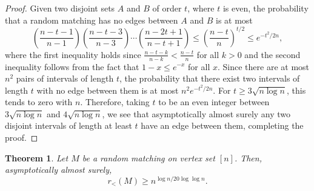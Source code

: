 \documentclass[11pt]{article}
\newtheorem{theorem}{Theorem}[section]
\newcommand{\rord}{r_{<}}
\begin{document}
\begin{proof}
Given two disjoint sets $A$ and $B$ of order $t$, where $t$ is even, the probability that a random matching has no edges between $A$ and $B$ is at most
\[
	\left(\frac{n-t-1}{n-1}\right) \left( \frac{n-t-3}{n-3} \right) \cdots \left( \frac{n-2t+1}{n-t+1} \right) \leq \left(\frac{n-t}{n}\right)^{t/2} \leq e^{-t^2/2n},
\]
where the first inequality holds since $\frac{n-t-k}{n-k} < \frac{n-t}{n}$ for all $k > 0$ and the second inequality follows from the fact that $1 - x \le e^{-x}$ for all $x$. Since there are at most $n^2$ pairs of intervals of length $t$, the probability that there exist two intervals of length $t$ with no edge between them is at most $n^2 e^{-t^2/2n}$. For $t \geq 3 \sqrt{n\log n}$, this tends to zero with $n$. Therefore, taking $t$ to be an even integer between $3 \sqrt{n \log n}$ and $4 \sqrt{n \log n}$, we see that asymptotically almost surely any two disjoint intervals of length at least $t$ have an edge between them, completing the proof.
\end{proof}

\begin{theorem} \label{thm:matchingrandom}
Let $M$ be a random matching on vertex set $[n]$. Then, asymptotically almost surely, 
\[\rord(M) \ge n^{\log n/20\log\log n}.\]
\end{theorem}
\end{document}
